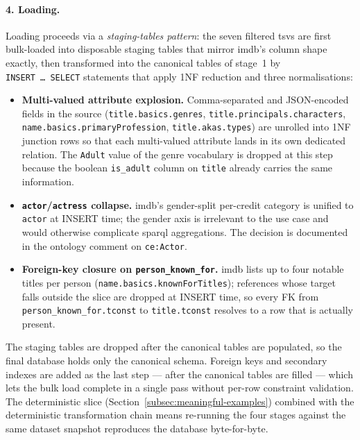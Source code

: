 \paragraph{4. Loading.}
Loading proceeds via a \emph{staging-tables pattern}: the seven filtered \acp{tsv} are first bulk-loaded into disposable staging tables that mirror \ac{imdb}'s column shape exactly, then transformed into the canonical tables of stage~1 by \texttt{INSERT~\dots~SELECT} statements that apply 1NF reduction and three normalisations:

\begin{sloppypar}
\begin{itemize}
    \item \textbf{Multi-valued attribute explosion.} Comma-separated and JSON-encoded fields in the source (\texttt{title.basics.genres}, \texttt{title.principals.characters}, \texttt{name.basics.primaryProfession}, \texttt{title.akas.types}) are unrolled into 1NF junction rows so that each multi-valued attribute lands in its own dedicated relation. The \texttt{Adult} value of the genre vocabulary is dropped at this step because the boolean \texttt{is\_adult} column on \texttt{title} already carries the same information.
    \item \textbf{\texttt{actor}/\texttt{actress} collapse.} \ac{imdb}'s gender-split per-credit category is unified to \texttt{actor} at INSERT time; the gender axis is irrelevant to the use case and would otherwise complicate \ac{sparql} aggregations. The decision is documented in the ontology comment on \texttt{ce:Actor}.
    \item \textbf{Foreign-key closure on \texttt{person\_known\_for}.} \ac{imdb} lists up to four notable titles per person (\texttt{name.basics.knownForTitles}); references whose target falls outside the slice are dropped at INSERT time, so every FK from \texttt{person\_known\_for.tconst} to \texttt{title.tconst} resolves to a row that is actually present.
\end{itemize}
\end{sloppypar}

The staging tables are dropped after the canonical tables are populated, so the final database holds only the canonical schema. Foreign keys and secondary indexes are added as the last step --- after the canonical tables are filled --- which lets the bulk load complete in a single pass without per-row constraint validation. The deterministic slice (Section~\ref{subsec:meaningful-examples}) combined with the deterministic transformation chain means re-running the four stages against the same dataset snapshot reproduces the database byte-for-byte.

